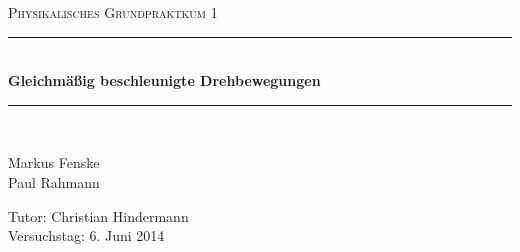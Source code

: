 \newcommand{\HRule}{\rule{\linewidth}{0.5mm}}

\begin{center}
  \textsc{\Large Physikalisches Grundpraktkum 1}
  \HRule\\[0.4 cm]
  {\huge \bfseries Gleichmäßig beschleunigte Drehbewegungen}
  \HRule\\[0.4 cm]

  \begin{minipage}{0.45\textwidth}
  \begin{flushleft}
    Markus Fenske \\
    Paul Rahmann
  \end{flushleft}
  \end{minipage}
  \hfill
  \begin{minipage}{0.45\textwidth}
  \begin{flushright}
    Tutor: Christian Hindermann \\
    Versuchstag: 6. Juni 2014
  \end{flushright}
  \end{minipage}

  \vspace{1cm}

  \tableofcontents


  \vfill
\end{center}
\newpage
